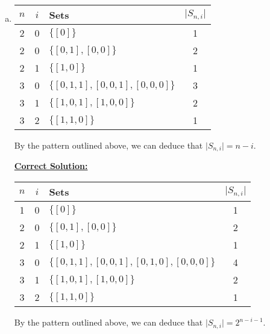 \documentclass[12pt]{article}
\begin{document}
\begin{enumerate}[a.]
\begin{itemize}
    \end{itemize}

    \item

    \begin{tabular}{|c|c|l|c|}
        \hline
        $n$ & $i$ & Sets & $\lvert S_{n,i} \rvert$\\
        \hline
        2 & 0 & $\{[0]\}$ & 1\\
        \hline
        2 & 0 & $\{[0,1],[0,0]\}$ & 2\\
        \hline
        2 & 1 & $\{[1,0]\}$ & 1\\
        \hline
        3 & 0 & $\{[0,1,1],[0,0,1],[0,0,0]\}$ & 3\\
        \hline
        3 & 1 & $\{[1,0,1],[1,0,0]\}$ & 2\\
        \hline
        3 & 2 & $\{[1,1,0]\}$ & 1\\
        \hline
    \end{tabular}

    \bigskip

    By the pattern outlined above, we can deduce that $\lvert S_{n,i} \rvert = n - i$.

    \bigskip

    \begin{mdframed}
        \underline{\textbf{Correct Solution:}}

        \bigskip

        \begin{tabular}{|c|c|l|c|}
            \hline
            $n$ & $i$ & Sets & $\lvert S_{n,i} \rvert$\\
            \hline
            \color{red}1 & 0 & $\{[0]\}$ & 1\\
            \hline
            2 & 0 & $\{[0,1],[0,0]\}$ & 2\\
            \hline
            2 & 1 & $\{[1,0]\}$ & 1\\
            \hline
            3 & 0 & \color{red}$\{[0,1,1],[0,0,1],[0,1,0],[0,0,0]\}$ & \color{red}4\\
            \hline
            3 & 1 & $\{[1,0,1],[1,0,0]\}$ & 2\\
            \hline
            3 & 2 & $\{[1,1,0]\}$ & 1\\
            \hline
        \end{tabular}

        \bigskip

        By the pattern outlined above, we can deduce that \color{red}$\lvert S_{n,i} \rvert = 2^{n-i-1}$\color{black}.


\end{mdframed}
\end{enumerate}
\end{document}
